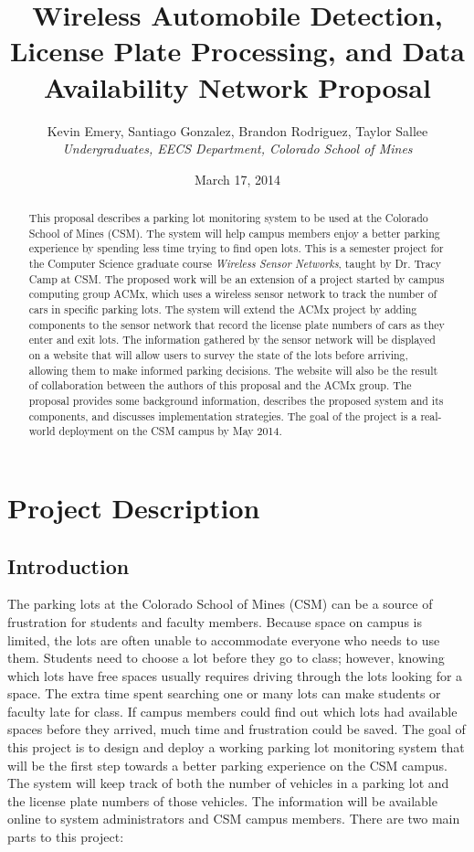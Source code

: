 \documentclass[11pt, oneside, fullpage, doublespace]{article}
\title{Wireless Automobile Detection, License Plate Processing, and Data Availability Network Proposal}
\author{Kevin Emery, Santiago Gonzalez, Brandon Rodriguez, Taylor Sallee\\ \emph{Undergraduates, EECS Department, Colorado School of Mines}}
\date{March 17, 2014}
\begin{document}
\maketitle

\begin{abstract}
This proposal describes a parking lot monitoring system to be used at the Colorado School of Mines (CSM). The system will help campus members enjoy a better parking experience by spending less time trying to find open lots. This is a semester project for the Computer Science graduate course \emph{Wireless Sensor Networks}, taught by Dr. Tracy Camp at CSM. The proposed work will be an extension of a project started by campus computing group ACMx, which uses a wireless sensor network to track the number of cars in specific parking lots. The system will extend the ACMx project by adding components to the sensor network that record the license plate numbers of cars as they enter and exit lots. The information gathered by the sensor network will be displayed on a website that will allow users to survey the state of the lots before arriving, allowing them to make informed parking decisions. The website will also be the result of collaboration between the authors of this proposal and the ACMx group. The proposal provides some background information, describes the proposed system and its components, and discusses implementation strategies. The goal of the project is a real-world deployment on the CSM campus by May 2014.
\end{abstract}

\section{Project Description}

\subsection{Introduction}

The parking lots at the Colorado School of Mines (CSM) can be a source of frustration for students and faculty members. Because space on campus is limited, the lots are often unable to accommodate everyone who needs to use them. Students need to choose a lot before they go to class; however, knowing which lots have free spaces usually requires driving through the lots looking for a space. The extra time spent searching one or many lots can make students or faculty late for class. If campus members could find out which lots had available spaces before they arrived, much time and frustration could be saved. The goal of this project is to design and deploy a working parking lot monitoring system that will be the first step towards a better parking experience on the CSM campus. The system will keep track of both the number of vehicles in a parking lot and the license plate numbers of those vehicles. The information will be available online to system administrators and CSM campus members. There are two main parts to this project:
\end{document}
